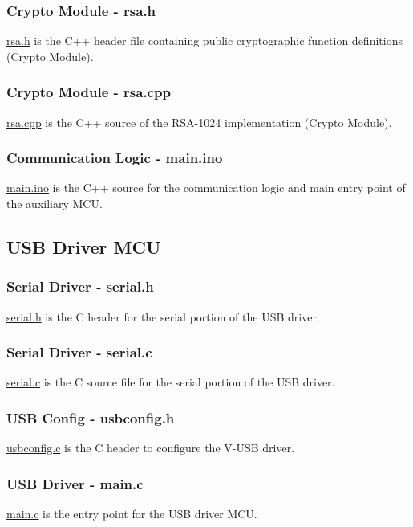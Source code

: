 \subsubsection{Crypto Module - rsa.h}
\label{sec:rsah}
\href{https://github.com/spacehen/EEE4022F/blob/main/Firmware/Auxiliary\%20MCU/rsa.h}{rsa.h} is the C++ header file containing public cryptographic function definitions (Crypto Module).
\subsubsection{Crypto Module - rsa.cpp}
\label{sec:rsacpp}
\href{https://github.com/spacehen/EEE4022F/blob/main/Firmware/Auxiliary\%20MCU/rsa.cpp}{rsa.cpp} is the C++ source of the RSA-1024 implementation (Crypto Module).
\subsubsection{Communication Logic - main.ino}
\label{sec:comm}
\href{https://github.com/spacehen/EEE4022F/blob/main/Firmware/Auxiliary\%20MCU/main.ino}{main.ino} is the C++ source for the communication logic and main entry point of the auxiliary MCU.
\subsection{USB Driver MCU}
\label{sec:usbmcu}
\subsubsection{Serial Driver - serial.h}
\href{https://github.com/spacehen/EEE4022F/blob/main/Firmware/USB\%20Driver\%20MCU/USB/serial.h}{serial.h} is the C header for the serial portion of the USB driver.
\subsubsection{Serial Driver - serial.c}
\href{https://github.com/spacehen/EEE4022F/blob/main/Firmware/USB\%20Driver\%20MCU/USB/serial.c}{serial.c} is the C source file for the serial portion of the USB driver.
\subsubsection{USB Config - usbconfig.h}
\href{https://github.com/spacehen/EEE4022F/blob/main/Firmware/USB\%20Driver\%20MCU/USB/usbconfig.h}{usbconfig.c} is the C header to configure the V-USB driver.
\subsubsection{USB Driver - main.c}
\href{https://github.com/spacehen/EEE4022F/blob/main/Firmware/USB\%20Driver\%20MCU/USB/main.c}{main.c} is the entry point for the USB driver MCU.


